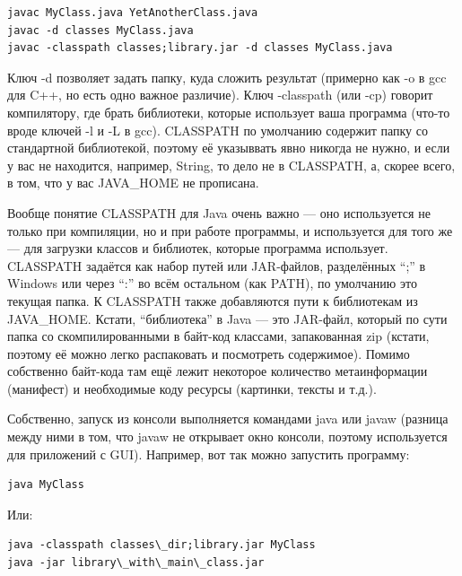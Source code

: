 \documentclass[a5paper]{article}
\begin{document}
\begin{verbatim}
javac MyClass.java YetAnotherClass.java
javac -d classes MyClass.java
javac -classpath classes;library.jar -d classes MyClass.java
\end{verbatim}

Ключ -d позволяет задать папку, куда сложить результат (примерно как -o в gcc для C++, но есть одно важное различие). Ключ -classpath (или -cp) говорит компилятору, где брать библиотеки, которые использует ваша программа (что-то вроде ключей -l и -L в gcc). CLASSPATH по умолчанию содержит папку со стандартной библиотекой, поэтому её указыввать явно никогда не нужно, и если у вас не находится, например, String, то дело не в CLASSPATH, а, скорее всего, в том, что у вас JAVA\_HOME не прописана.

Вообще понятие CLASSPATH для Java очень важно --- оно используется не только при компиляции, но и при работе программы, и используется для того же --- для загрузки классов и библиотек, которые программа использует. CLASSPATH задаётся как набор путей или JAR-файлов, разделённых ``;'' в Windows или через ``:'' во всём остальном (как PATH), по умолчанию это текущая папка. К CLASSPATH также добавляются пути к библиотекам из JAVA\_HOME. Кстати, ``библиотека'' в Java --- это JAR-файл, который по сути папка со скомпилированными в байт-код классами, запакованная zip (кстати, поэтому её можно легко распаковать и посмотреть содержимое). Помимо собственно байт-кода там ещё лежит некоторое количество метаинформации (манифест) и необходимые коду ресурсы (картинки, тексты и т.д.).

Собственно, запуск из консоли выполняется командами java или javaw (разница между ними в том, что javaw не открывает окно консоли, поэтому используется для приложений с GUI). Например, вот так можно запустить программу:

\begin{verbatim}
java MyClass
\end{verbatim}

Или:

\begin{verbatim}
java -classpath classes\_dir;library.jar MyClass
java -jar library\_with\_main\_class.jar
\end{verbatim}
\end{document}
